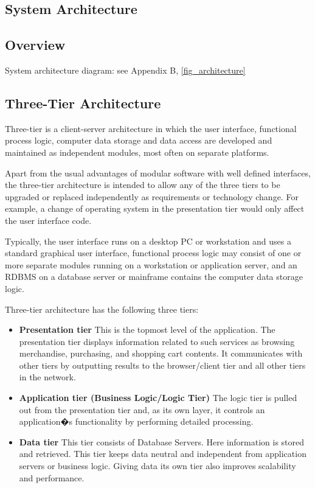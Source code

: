 \documentclass[salesmen, twoside]{../../../templates/latex/2009/softproj}
\begin{document}
\begin{projdoc}
\chapter{System Architecture}
\section{Overview}
System architecture diagram: see Appendix B, \ref{fig_architecture}

\section{Three-Tier Architecture}
Three-tier is a client-server architecture in which the user interface, functional process logic, computer data storage and data access are developed and maintained as independent modules, most often on separate platforms.

Apart from the usual advantages of modular software with well defined interfaces, the three-tier architecture is intended to allow any of the three tiers to be upgraded or replaced independently as requirements or technology change. For example, a change of operating system in the presentation tier would only affect the user interface code.

Typically, the user interface runs on a desktop PC or workstation and uses a standard graphical user interface, functional process logic may consist of one or more separate modules running on a workstation or application server, and an RDBMS on a database server or mainframe contains the computer data storage logic.

Three-tier architecture has the following three tiers:
\begin{itemize}
\item \textbf{Presentation tier}
This is the topmost level of the application. The presentation tier displays information related to such services as browsing merchandise, purchasing, and shopping cart contents. It communicates with other tiers by outputting results to the browser/client tier and all other tiers in the network.
\item \textbf{Application tier (Business Logic/Logic Tier)}
The logic tier is pulled out from the presentation tier and, as its own layer, it controls an application�s functionality by performing detailed processing.
\item \textbf{Data tier}
This tier consists of Database Servers. Here information is stored and retrieved. This tier keeps data neutral and independent from application servers or business logic. Giving data its own tier also improves scalability and performance. 
\end{itemize}


\end{projdoc}
\end{document}
